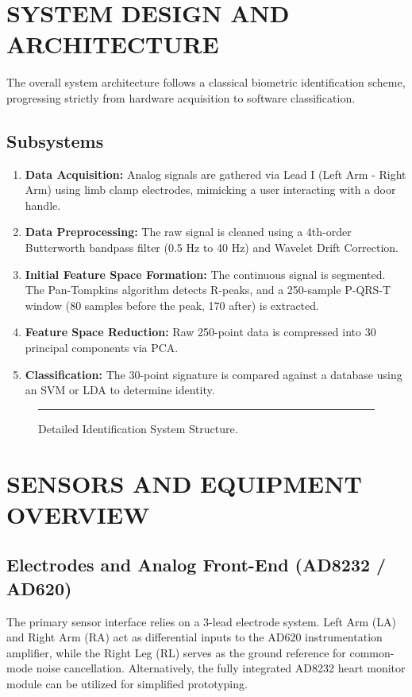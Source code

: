 \documentclass[12pt,a4paper]{report}
\begin{document}
\chapter{SYSTEM DESIGN AND ARCHITECTURE}
The overall system architecture follows a classical biometric identification scheme, progressing strictly from hardware acquisition to software classification.

\section{Subsystems}
\begin{enumerate}
    \item \textbf{Data Acquisition:} Analog signals are gathered via Lead I (Left Arm - Right Arm) using limb clamp electrodes, mimicking a user interacting with a door handle.
    \item \textbf{Data Preprocessing:} The raw signal is cleaned using a 4th-order Butterworth bandpass filter (0.5 Hz to 40 Hz) and Wavelet Drift Correction.
    \item \textbf{Initial Feature Space Formation:} The continuous signal is segmented. The Pan-Tompkins algorithm detects R-peaks, and a 250-sample P-QRS-T window (80 samples before the peak, 170 after) is extracted.
    \item \textbf{Feature Space Reduction:} Raw 250-point data is compressed into 30 principal components via PCA.
    \item \textbf{Classification:} The 30-point signature is compared against a database using an SVM or LDA to determine identity.
\end{enumerate}

\begin{figure}[htbp]
    \centering
    \rule{10cm}{6cm} %
    \caption{Detailed Identification System Structure.}
\end{figure}

\chapter{SENSORS AND EQUIPMENT OVERVIEW}
\section{Electrodes and Analog Front-End (AD8232 / AD620)}
The primary sensor interface relies on a 3-lead electrode system. Left Arm (LA) and Right Arm (RA) act as differential inputs to the AD620 instrumentation amplifier, while the Right Leg (RL) serves as the ground reference for common-mode noise cancellation. Alternatively, the fully integrated AD8232 heart monitor module can be utilized for simplified prototyping.
\end{document}
